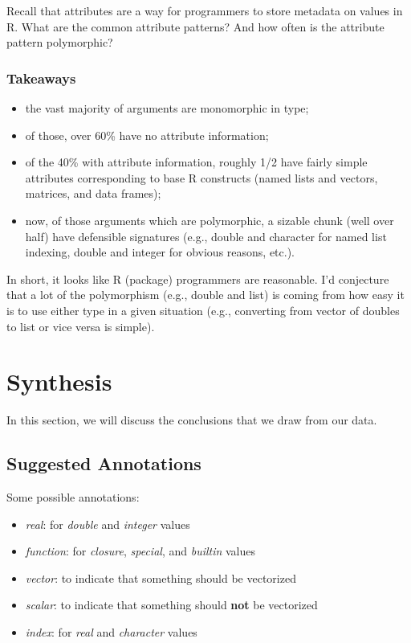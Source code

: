 \documentclass[acmsmall,10pt,review,anonymous]{acmart}\settopmatter{printfolios=true,printccs=false,printacmref=false}
\begin{document}
Recall that attributes are a way for programmers to store metadata on values in R.
What are the common attribute patterns?
And how often is the attribute pattern polymorphic?

\subsubsection{Takeaways}

\begin{itemize}
    \item the vast majority of arguments are monomorphic in type;
    \item of those, over 60\% have no attribute information;
    \item of the 40\% with attribute information, roughly 1/2 have fairly
      simple attributes corresponding to base R constructs (named lists and
      vectors, matrices, and data frames);
    \item now, of those arguments which are polymorphic, a sizable chunk (well over half) have defensible signatures (e.g., double and character for named list indexing, double and integer for obvious reasons, etc.).
\end{itemize}

In short, it looks like R (package) programmers are reasonable.  I'd
conjecture that a lot of the polymorphism (e.g., double and list) is coming
from how easy it is to use either type in a given situation (e.g.,
converting from vector of doubles to list or vice versa is simple).

%
%
%
%
%
%
\section{Synthesis}

In this section, we will discuss the conclusions that we draw from our data.


%
%
\subsection{Suggested Annotations}


Some possible annotations:

\begin{itemize}
    \item \textit{real}: for \textit{double} and \textit{integer} values
    \item \textit{function}: for \textit{closure}, \textit{special}, and \textit{builtin} values
    \item \textit{vector}: to indicate that something should be vectorized
    \item \textit{scalar}: to indicate that something should \textbf{not} be vectorized
    \item \textit{index}: for \textit{real} and \textit{character} values
\end{itemize}
\end{document}
